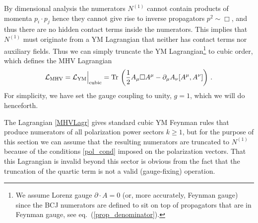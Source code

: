 \documentclass[11pt,a4paper]{article}
\def\eqn#1{eq.~(\ref{#1})}
\begin{document}
By dimensional analysis the numerators $N^{(1)}$ cannot contain products of momenta $p_i \cdot p_j$ hence they cannot give rise to inverse propagators $p^2 \sim \Box$, and thus there are no hidden contact terms inside the numerators. This implies that $N^{(1)}$ must originate from a YM Lagrangian that neither has contact terms nor auxiliary fields. Thus we can simply truncate the YM Lagrangian\footnote{We assume Lorenz gauge $\partial \cdot A=0$ (or, more accurately, Feynman gauge) since the BCJ numerators are defined to sit on top of propagators that are in Feynman gauge, see \eqn{prop_denominator}.} to cubic order, which defines the MHV Lagrangian 
\begin{equation} \label{MHVLagr}
    \mathcal{L}_{\textrm{MHV}} = \mathcal{L}_{\textrm{YM}}\Big|_{\rm cubic} = \text{Tr} \, \left( \frac{1}{2} A_\mu \Box A^\mu -\partial_\mu A_\nu [A^\mu,A^\nu] \right) \, .
\end{equation}
For simplicity, we have set the gauge coupling to unity, $g=1$, which we will do henceforth.

The Lagrangian \eqref{MHVLagr} gives standard cubic YM Feynman rules that produce numerators of all polarization power sectors $k\ge 1$, but for the purpose of this section we can assume that the resulting numerators are truncated to $N^{(1)}$ because of the conditions \eqref{pol_cond} imposed on the polarization vectors. That this Lagrangian is invalid beyond this sector is obvious from the fact that the truncation of the quartic term is not a valid (gauge-fixing) operation. 
\end{document}
